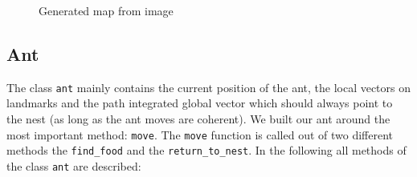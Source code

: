 \documentclass[11pt]{article}
\begin{document}
\begin{figure}[h!]
	\centering
	\caption[Generating a map from image]{Generated map from image}
\end{figure}

\subsection{Ant}

The class \texttt{ant} mainly contains the current position of the ant, the local vectors on landmarks and the path integrated global vector which should always point to the nest (as long as the ant moves are coherent).
We built our ant around the most important method: \texttt{move}. The  \texttt{move} function is called out of two different methods the  \texttt{find\_food} and the \texttt{return\_to\_nest}. In the following all methods of the class \texttt{ant} are described:
\end{document}
